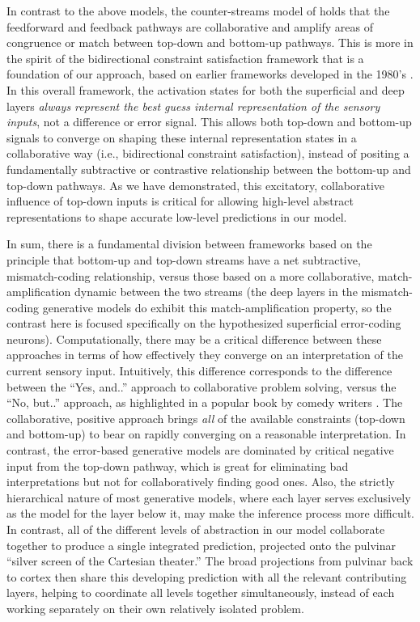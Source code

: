 \documentclass[11pt,twoside]{article}
\newif\myifpdf
\begin{document}
In contrast to the above models, the counter-streams model of  holds that the feedforward and feedback pathways are collaborative and amplify areas of congruence or match between top-down and bottom-up pathways.  This is more in the spirit of the bidirectional constraint satisfaction framework that is a foundation of our approach, based on earlier frameworks developed in the 1980's \cite{Hopfield82,Hopfield84,AckleyHintonSejnowski85,RumelhartMcClelland82}.  In this overall framework, the activation states for both the superficial and deep layers {\em always represent the best guess internal representation of the sensory inputs}, not a difference or error signal.  This allows both top-down and bottom-up signals to converge on shaping these internal representation states in a collaborative way (i.e., bidirectional constraint satisfaction), instead of positing a fundamentally subtractive or contrastive relationship between the bottom-up and top-down pathways.  As we have demonstrated, this excitatory, collaborative influence of top-down inputs is critical for allowing high-level abstract representations to shape accurate low-level predictions in our model.

In sum, there is a fundamental division between frameworks based on the principle that bottom-up and top-down streams have a net subtractive, mismatch-coding relationship, versus those based on a more collaborative, match-amplification dynamic between the two streams (the deep layers in the mismatch-coding generative models do exhibit this match-amplification property, so the contrast here is focused specifically on the hypothesized superficial error-coding neurons).  Computationally, there may be a critical difference between these approaches in terms of how effectively they converge on an interpretation of the current sensory input.  Intuitively, this difference corresponds to the difference between the ``Yes, and..'' approach to collaborative problem solving, versus the ``No, but..'' approach, as highlighted in a popular book by comedy writers \cite{LeonardYorton15}.  The collaborative, positive approach brings {\em all} of the available constraints (top-down and bottom-up) to bear on rapidly converging on a reasonable interpretation.  In contrast, the error-based generative models are dominated by critical negative input from the top-down pathway, which is great for eliminating bad interpretations but not for collaboratively finding good ones.  Also, the strictly hierarchical nature of most generative models, where each layer serves exclusively as the model for the layer below it, may make the inference process more difficult.  In contrast, all of the different levels of abstraction in our model collaborate together to produce a single integrated prediction, projected onto the pulvinar ``silver screen of the Cartesian theater.''  The broad projections from pulvinar back to cortex then share this developing prediction with all the relevant contributing layers, helping to coordinate all levels together simultaneously, instead of each working separately on their own relatively isolated problem.
\end{document}
